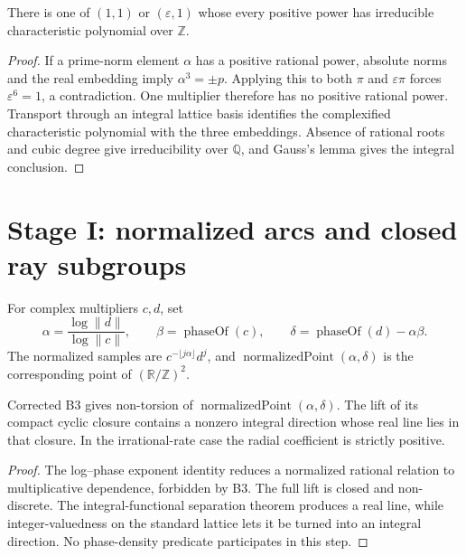 \begin{lemma}[Canonical B1]
  \label{lem:canonical-b1}
  \leanok
  There is one of \((1,1)\) or \((\varepsilon,1)\) whose every positive power
  has irreducible characteristic polynomial over \(\mathbb Z\).
\end{lemma}
\begin{proof}
  If a prime-norm element \(\alpha\) has a positive rational power, absolute
  norms and the real embedding imply \(\alpha^3=\pm p\). Applying this to both
  \(\pi\) and \(\varepsilon\pi\) forces \(\varepsilon^6=1\), a contradiction.
  One multiplier therefore has no positive rational power. Transport through
  an integral lattice basis identifies the complexified characteristic
  polynomial with the three embeddings. Absence of rational roots and cubic
  degree give irreducibility over \(\mathbb Q\), and Gauss's lemma gives the
  integral conclusion.
\end{proof}

\section{Stage I: normalized arcs and closed ray subgroups}

\begin{definition}
  \label{def:normalized-samples}
  \leanok
  For complex multipliers \(c,d\), set
  \[
    \alpha=\frac{\log\|d\|}{\log\|c\|},\qquad
    \beta=\operatorname{phaseOf}(c),\qquad \delta=\operatorname{phaseOf}(d)-\alpha\beta.
  \]
  The normalized samples are \(c^{-\lfloor j\alpha\rfloor}d^j\), and
  \(\operatorname{normalizedPoint}(\alpha,\delta)\) is the corresponding point
  of \((\mathbb R/\mathbb Z)^2\).
\end{definition}

\begin{lemma}
  \label{lem:phase-direction}
  \leanok
  Corrected B3 gives non-torsion of \(\operatorname{normalizedPoint}(\alpha,\delta)\).
  The lift of its compact cyclic closure contains a nonzero integral direction
  whose real line lies in that closure. In the irrational-rate case the radial
  coefficient is strictly positive.
\end{lemma}
\begin{proof}
  The log--phase exponent identity reduces a normalized rational relation to
  multiplicative dependence, forbidden by B3. The full lift is closed and
  non-discrete. The integral-functional separation theorem produces a real
  line, while integer-valuedness on the standard lattice lets it be turned into
  an integral direction. No phase-density predicate participates in this step.
\end{proof}


